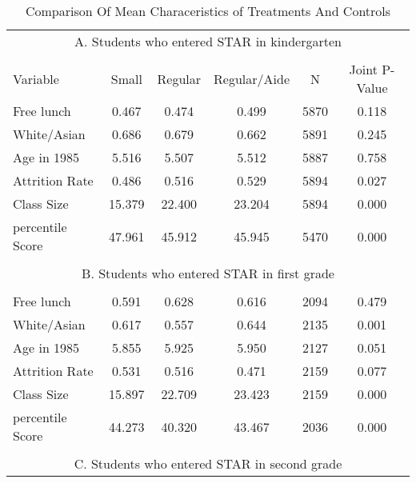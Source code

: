 \documentclass{article}
\begin{document}
\begin{table}[htbp]
  \centering
  \caption{Comparison Of Mean Characeristics of Treatments And Controls}
    \begin{tabular}{llccccc}
    \toprule
    \multicolumn{7}{c}{A. Students who entered STAR in kindergarten} \\
          &       &       &       &       &       &  \\
    \multicolumn{2}{l}{Variable} & Small & Regular & Regular/Aide & N     & Joint P-Value \\
    \midrule
    \multicolumn{2}{l}{Free lunch} & 0.467  & 0.474  & 0.499  & 5870  & 0.118  \\
    \multicolumn{2}{l}{White/Asian} & 0.686  & 0.679  & 0.662  & 5891  & 0.245  \\
    \multicolumn{2}{l}{Age in 1985} & 5.516  & 5.507  & 5.512  & 5887  & 0.758  \\
    \multicolumn{2}{l}{Attrition Rate} & 0.486  & 0.516  & 0.529  & 5894  & 0.027  \\
    \multicolumn{2}{l}{Class Size} & 15.379  & 22.400  & 23.204  & 5894  & 0.000  \\
    \multicolumn{2}{l}{percentile Score} & 47.961  & 45.912  & 45.945  & 5470  & 0.000  \\
          &       &       &       &       &       &  \\
    \multicolumn{7}{c}{B. Students who entered STAR in first grade} \\
    \multicolumn{2}{c}{} &       &       &       &       &  \\
    \multicolumn{2}{l}{Free lunch} & 0.591  & 0.628  & 0.616  & 2094  & 0.479  \\
    \multicolumn{2}{l}{White/Asian} & 0.617  & 0.557  & 0.644  & 2135  & 0.001  \\
    \multicolumn{2}{l}{Age in 1985} & 5.855  & 5.925  & 5.950  & 2127  & 0.051  \\
    \multicolumn{2}{l}{Attrition Rate} & 0.531  & 0.516  & 0.471  & 2159  & 0.077  \\
    \multicolumn{2}{l}{Class Size} & 15.897  & 22.709  & 23.423  & 2159  & 0.000  \\
    \multicolumn{2}{l}{percentile Score} & 44.273  & 40.320  & 43.467  & 2036  & 0.000  \\
          &       &       &       &       &       &  \\
    \multicolumn{7}{c}{C. Students who entered STAR in second grade} \\

\end{tabular}
\end{table}
\end{document}
